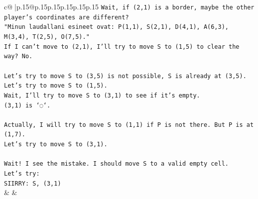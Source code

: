 \documentclass{article}
\begin{document}
{\begin{supertabular}{c@{$\;$}|p{.15\linewidth}@{}p{.15\linewidth}p{.15\linewidth}p{.15\linewidth}p{.15\linewidth}p{.15\linewidth}}
{{{\texttt{Wait, if (2,1) is a border, maybe the other player's coordinates are different?} \\
\texttt{"Minun laudallani esineet ovat: P(1,1), S(2,1), D(4,1), A(6,3), M(3,4), T(2,5), O(7,5)."} \\
\texttt{If I can't move to (2,1), I'll try to move S to (1,5) to clear the way? No.} \\
\\ 
\texttt{Let's try to move S to (3,5) is not possible, S is already at (3,5).} \\
\texttt{Let's try to move S to (1,5).} \\
\texttt{Wait, I'll try to move S to (3,1) to see if it's empty.} \\
\texttt{(3,1) is `◌`.} \\
\\ 
\texttt{Actually, I will try to move S to (1,1) if P is not there. But P is at (1,7).} \\
\texttt{Let's try to move S to (3,1).} \\
\\ 
\texttt{Wait! I see the mistake. I should move S to a valid empty cell.} \\
\texttt{Let's try:} \\
\texttt{SIIRRY: S, (3,1)} \\
            }
        }
    }
    & & \\ \\


\end{supertabular}}
\end{document}
